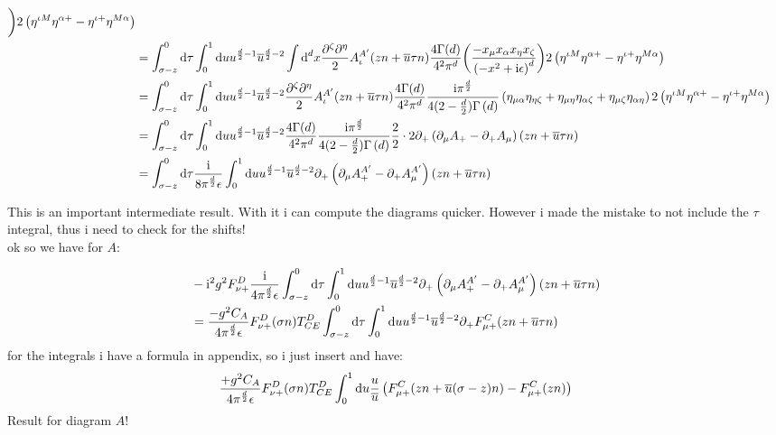\begin{align}
	\bigg)  2\left(\eta^{\iota M } \eta^{\alpha +}  - \eta^{\iota +} \eta^{M\alpha} \right)
	\\
	&=
	\int^{0}_{\sigma-z}\text{d} \tau\int _0^1 \text{d} u u^{\frac{d}{2}-1} \overline u ^{\frac{d}{2}-2}\int \text{d} ^d x  \frac{\partial^\zeta \partial^\eta}{2} A_\iota^{A'}(z n + \overline u \tau n) \frac{4\Gamma(d)}{4^2\pi^{d}}\bigg( \frac{ -x_\mu x_\alpha x_\eta x_\zeta}{\left(-x^2+\text{i} \epsilon\right)^{d}} 
	\bigg)  2\left(\eta^{\iota M } \eta^{\alpha +}  - \eta^{\iota +} \eta^{M\alpha} \right)
	\\
	&=
	\int^{0}_{\sigma-z}\text{d} \tau\int _0^1 \text{d} u u^{\frac{d}{2}-1} \overline u ^{\frac{d}{2}-2} \frac{\partial^\zeta \partial^\eta}{2} A_\iota^{A'}(z n + \overline u \tau n) \frac{4\Gamma(d)}{4^2\pi^{d}}\frac{\text{i} \pi^{\frac{d}{2}}}{4(2-\frac{d}{2})\Gamma\left(d\right)}\left(\eta_{\mu\alpha}\eta_{\eta \zeta} + \eta_{\mu \eta} \eta_{\alpha \zeta} +\eta_{\mu \zeta}\eta_{\alpha \eta}\right)  2\left(\eta^{\iota M } \eta^{\alpha +}  - \eta^{\iota +} \eta^{M\alpha} \right)
	\\
	&=
	\int^{0}_{\sigma-z} \text{d} \tau\int _0^1 \text{d} u u^{\frac{d}{2}-1} \overline u ^{\frac{d}{2}-2}  \frac{4\Gamma(d)}{4^2\pi^{d}}\frac{\text{i} \pi^{\frac{d}{2}}}{4(2-\frac{d}{2})\Gamma\left(d\right)}\frac{2}{2}\cdot 2 \partial_+ \left( \partial_\mu A_+ - \partial_+ A_\mu\right)(zn+\overline u \tau n)
	\\
	&=
	\int^{0}_{\sigma-z} \text{d} \tau\frac{\text{i}}{8\pi^{\frac{d}{2}}\epsilon}\int _0^1 \text{d} u u^{\frac{d}{2}-1} \overline u ^{\frac{d}{2}-2} \partial_+ \left( \partial_\mu A_+^{A'} - \partial_+ A_\mu^{A'}\right)(zn+\overline u \tau n)
\end{align}

This is an important intermediate result. 
With it i can compute the diagrams quicker.
However i made the mistake to not include the $\tau$ integral, thus i need to check for the shifts! \\
ok so we have for $A$:

\begin{align}
	&-\text{i}^2 g^2 F_{\nu +} ^D\frac{\text{i}}{4\pi^{\frac{d}{2}}\epsilon}\int ^{0}_{\sigma-z} \text{d} \tau \int _0^1 \text{d} u u^{\frac{d}{2}-1} \overline u ^{\frac{d}{2}-2} \partial_+ \left( \partial_\mu A_+^{A'} - \partial_+ A_\mu^{A'}\right)(zn+\overline u \tau n)
	\\
	&=
	\frac{-g^2C_A}{4\pi^{\frac{d}{2}}\epsilon}F_{\nu +} ^D(\sigma n) T^D_{CE}\int ^{0}_{\sigma-z} \text{d} \tau\int _0^1 \text{d} u u^{\frac{d}{2}-1} \overline u ^{\frac{d}{2}-2} \partial_+ F_{\mu +}^C (zn+\overline u \tau n)
\end{align}
for the integrals i have a formula in appendix, so i just insert and have:
\begin{align}
	\frac{+g^2C_A}{4\pi^{\frac{d}{2}}\epsilon}F_{\nu +} ^D(\sigma n) T^D_{CE}\int _0^1 \text{d} u \frac{u}{\overline u} \left(F_{\mu +}^C (zn+ \overline u(\sigma -z) n) - F_{\mu +}^C(zn)\right)
\end{align}
Result for diagram $A$!

